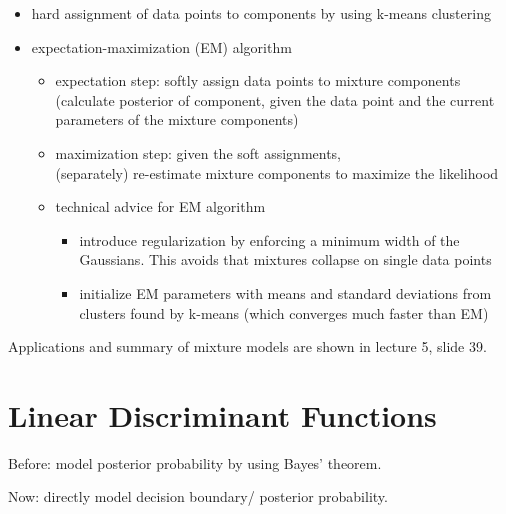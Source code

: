 \documentclass{article}
\begin{document}
\begin{itemize}
  \item hard assignment of data points to components by using k-means clustering
  \item expectation-maximization (EM) algorithm
  \begin{itemize}
    \item expectation step: softly assign data points to mixture components (calculate posterior of component, given the data point and the current parameters of the mixture components)
    \item maximization step: given the soft assignments, \\ (separately) re-estimate mixture components to maximize the likelihood
    \item technical advice for EM algorithm
    \begin{itemize}
      \item introduce regularization by enforcing a minimum width of the Gaussians. This avoids that mixtures collapse on single data points
      \item initialize EM parameters with means and standard deviations from clusters found by k-means (which converges much faster than EM)
    \end{itemize}
  \end{itemize}
\end{itemize}

Applications and summary of mixture models are shown in lecture 5, slide 39.

\section{Linear Discriminant Functions}

Before: model posterior probability by using Bayes' theorem.

Now: directly model decision boundary/ posterior probability.
\end{document}
